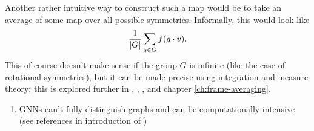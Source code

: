Another rather intuitive way to construct such a map would be to take an average of some map over all possible symmetries.
Informally, this would look like
\[
    \frac{1}{\left| G \right|} \sum_{g \in G} f(g \cdot v).
\]
This of course doesn't make sense if the group $G$ is infinite (like the case of rotational symmetries), but it can be made precise using integration and measure theory; this is explored further in \cite{dym2024equivariant}, \cite{puny2022frameaveraginginvariantequivariant}, \cite{ma2024canonicalizationperspectiveinvariantequivariant}, and chapter \ref{ch:frame-averaging}.

\begin{enumerate}
    \item GNNs can't fully distinguish graphs and can be computationally intensive (see references in introduction of \cite{puny2022frameaveraginginvariantequivariant})
\end{enumerate}
